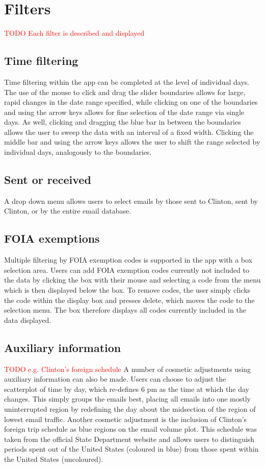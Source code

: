 \documentclass[journal]{vgtc}                %
\newcommand*{\TODO}[1]{\textcolor{red}{TODO #1}}
\begin{document}
\section{Filters}
\TODO{Each filter is described and displayed }
\subsection{Time filtering}
Time filtering within the app can be completed at the level of individual days. The use of the mouse to click and drag the slider boundaries allows for large, rapid changes in the date range specified, while clicking on one of the boundaries and using the arrow keys allows for fine selection of the date range via single days. As well, clicking and dragging the blue bar in between the boundaries allows the user to sweep the data with an interval of a fixed width. Clicking the middle bar and using the arrow keys allows the user to shift the range selected by individual days, analogously to the boundaries.
\subsection{Sent or received}
A drop down menu allows users to select emails by those sent to Clinton, sent by Clinton, or by the entire email database.
\subsection{FOIA exemptions}
Multiple filtering by FOIA exemption codes is supported in the app with a box selection area. Users can add FOIA exemption codes currently not included to the data by clicking the box with their mouse and selecting a code from the menu which is then displayed below the box. To remove codes, the user simply clicks the code within the display box and presses delete, which moves the code to the selection menu. The box therefore displays all codes currently included in the data displayed.
\subsection{Auxiliary information}
\TODO{e.g. Clinton's foreign schedule}
A number of cosmetic adjustments using auxiliary information can also be made. Users can choose to adjust the scatterplot of time by day, which re-defines 6 pm as the time at which the day changes. This simply groups the emails best, placing all emails into one mostly uninterrupted region by redefining the day about the midsection of the region of lowest email traffic. Another cosmetic adjustment is the inclusion of Clinton's foreign trip schedule as blue regions on the email volume plot. This schedule was taken from the official State Department website \cite{ForeignSched} and allows users to distinguish periods spent out of the United States (coloured in blue) from those spent within the United States (uncoloured).
\end{document}
